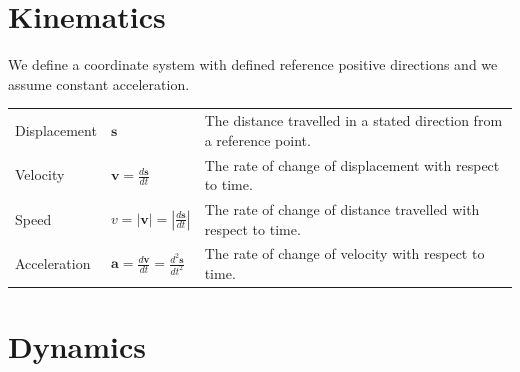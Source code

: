 \documentclass[a4paper,11pt]{article}
\begin{document}
	\section{Kinematics}
	We define a coordinate system with defined reference positive directions and we assume constant acceleration.
	\begin{center}
		\renewcommand{\arraystretch}{1.2}
		\begin{tabular}{@{} l l p{9.1cm} @{}}
			\toprule
			Displacement & $\textbf{s}$ & The distance travelled in a stated direction from a reference point. \\
			Velocity & $\displaystyle \textbf{v} = \frac{d\textbf{s}}{dt}$ & The rate of change of displacement with respect to time.\\
			\rule{0pt}{20pt}Speed & $\displaystyle v=\left|\textbf{v}\right| = \left|\frac{d\textbf{s}}{dt}\right|$ & The rate of change of distance travelled with respect to time. \\
			\rule{0pt}{20pt}Acceleration &  $\displaystyle \textbf{a} = \frac{d\textbf{v}}{dt} = \frac{d^2\textbf{s}}{dt^2}$ & The rate of change of velocity with respect to time. \\
			\bottomrule
		\end{tabular}
	\end{center}
	
	\section{Dynamics}
\end{document}
